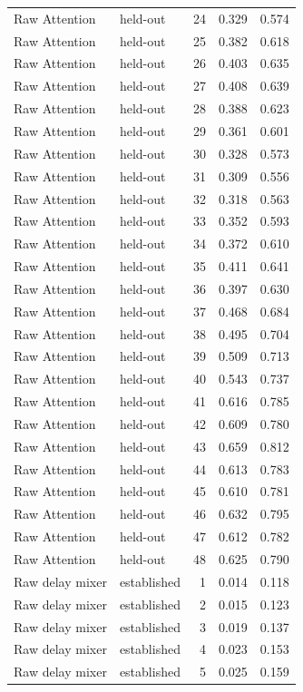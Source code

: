 \begin{tabular}{llrrr}
Raw Attention & held-out & 24 & 0.329 & 0.574 \\
Raw Attention & held-out & 25 & 0.382 & 0.618 \\
Raw Attention & held-out & 26 & 0.403 & 0.635 \\
Raw Attention & held-out & 27 & 0.408 & 0.639 \\
Raw Attention & held-out & 28 & 0.388 & 0.623 \\
Raw Attention & held-out & 29 & 0.361 & 0.601 \\
Raw Attention & held-out & 30 & 0.328 & 0.573 \\
Raw Attention & held-out & 31 & 0.309 & 0.556 \\
Raw Attention & held-out & 32 & 0.318 & 0.563 \\
Raw Attention & held-out & 33 & 0.352 & 0.593 \\
Raw Attention & held-out & 34 & 0.372 & 0.610 \\
Raw Attention & held-out & 35 & 0.411 & 0.641 \\
Raw Attention & held-out & 36 & 0.397 & 0.630 \\
Raw Attention & held-out & 37 & 0.468 & 0.684 \\
Raw Attention & held-out & 38 & 0.495 & 0.704 \\
Raw Attention & held-out & 39 & 0.509 & 0.713 \\
Raw Attention & held-out & 40 & 0.543 & 0.737 \\
Raw Attention & held-out & 41 & 0.616 & 0.785 \\
Raw Attention & held-out & 42 & 0.609 & 0.780 \\
Raw Attention & held-out & 43 & 0.659 & 0.812 \\
Raw Attention & held-out & 44 & 0.613 & 0.783 \\
Raw Attention & held-out & 45 & 0.610 & 0.781 \\
Raw Attention & held-out & 46 & 0.632 & 0.795 \\
Raw Attention & held-out & 47 & 0.612 & 0.782 \\
Raw Attention & held-out & 48 & 0.625 & 0.790 \\
Raw delay mixer & established & 1 & 0.014 & 0.118 \\
Raw delay mixer & established & 2 & 0.015 & 0.123 \\
Raw delay mixer & established & 3 & 0.019 & 0.137 \\
Raw delay mixer & established & 4 & 0.023 & 0.153 \\
Raw delay mixer & established & 5 & 0.025 & 0.159 \\

\end{tabular}
